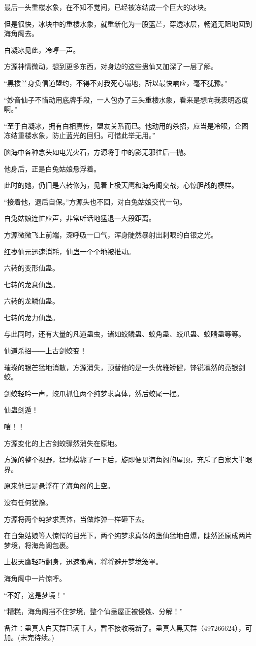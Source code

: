 \begin{this_body}
最后一头重楼水象，在不知不觉间，已经被冻结成一个巨大的冰块。

但是很快，冰块中的重楼水象，就重新化为一股蓝芒，穿透冰层，畅通无阻地回到海角阁去。

白凝冰见此，冷哼一声。

方源神情微动，想到更多东西，对身边的这些蛊仙又加深了一层了解。

“黑楼兰身负信道盟约，不得不对我死心塌地，所以最快响应，毫不犹豫。”

“妙音仙子不惜动用底牌手段，一人包办了三头重楼水象，看来是想向我表明态度啊。”

“至于白凝冰，拥有白相真传，盟友关系而已。他动用的杀招，应当是冷眼，企图冻结重楼水象，防止蓝光的回归。可惜此举无用。”

脑海中各种念头如电光火石，方源将手中的影无邪往后一抛。

他身后，正是白兔姑娘悬浮着。

此时的她，仍旧是六转修为，见着上极天鹰和海角阁交战，心惊胆战的模样。

“接着他，退后自保。”方源头也不回，对白兔姑娘交代一句。

白兔姑娘连忙应声，非常听话地猛退一大段距离。

方源微微飞上前端，深呼吸一口气，浑身陡然暴射出刺眼的白银之光。

红枣仙元迅速消耗，仙蛊一个个地被推动。

六转的变形仙蛊。

七转的龙息仙蛊。

六转的龙鳞仙蛊。

七转的龙力仙蛊。

与此同时，还有大量的凡道蛊虫，诸如蛟鳞蛊、蛟角蛊、蛟爪蛊、蛟睛蛊等等。

仙道杀招――上古剑蛟变！

璀璨的银芒猛地消散，方源消失，顶替他的是一头优雅矫健，锋锐凛然的亮银剑蛟。

剑蛟轻吟一声，蛟爪抓住两个纯梦求真体，然后蛟尾一摆。

仙蛊剑遁！

嗖！！

方源变化的上古剑蛟骤然消失在原地。

方源的整个视野，猛地模糊了一下后，旋即便见海角阁的屋顶，充斥了自家大半眼界。

原来他已是悬浮在了海角阁的上空。

没有任何犹豫。

方源将两个纯梦求真体，当做炸弹一样砸下去。

在白兔姑娘等人惊愕的目光下，两个纯梦求真体的蛊仙猛地自爆，陡然还原成两片梦境，将海角阁包裹。

上极天鹰轻巧翻身，迅速撤离，将将避开梦境笼罩。

海角阁中一片惊呼。

“不好，这是梦境！”

“糟糕，海角阁挡不住梦境，整个仙蛊屋正被侵蚀、分解！”

备注：蛊真人白天群已满千人，暂不接收萌新了。蛊真人黑天群（497266624），可加。(未完待续。)

\end{this_body}

